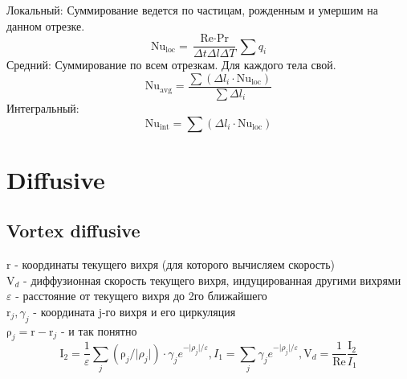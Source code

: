 \documentclass[14pt]{extreport}
\newcommand{\br}[1]{\boldsymbol{\mathrm{#1}}}
\newcommand{\Reyn}{\text{Re}}
\newcommand{\Pran}{\text{Pr}}
\newcommand{\Nuss}{\text{Nu}}
\begin{document}
Локальный: Суммирование ведется по частицам, рожденным и умершим на данном отрезке.
$$\Nuss_\text{loc} = \dfrac{\Reyn \cdot \Pran}{\Delta t \Delta l \Delta T} \sum q_i$$
Средний: Суммирование по всем отрезкам. Для каждого тела свой.
$$\Nuss_\text{avg} = \dfrac{\sum (\Delta l_i \cdot \Nuss_\text{loc})}{\sum \Delta l_i}$$
Интегральный:
$$\Nuss_\text{int} = \sum ( \Delta l_i \cdot \Nuss_\text{loc})$$


\newpage
\section{Diffusive}
\subsection{Vortex diffusive}

$\br r$ - координаты текущего вихря (для которого вычисляем скорость) \\
$\br V_d$ - диффузионная скорость текущего вихря, индуцированная другими вихрями \\
$\varepsilon$ - расстояние от текущего вихря до 2го ближайшего \\
$\br r_j, \gamma_j$ - координата j-го вихря и его циркуляция \\
$\br\rho_j = \br r - \br r_j$ - и так понятно \\

\begin{equation*}
\br I_2 = \dfrac{1}{\varepsilon}
\sum\limits_j (\br\rho_j / \lvert\rho_j\rvert)\cdot\gamma_j e^{-\lvert\rho_j\rvert/\varepsilon},
I_1 = {\sum\limits_j \gamma_j e^{-\lvert\rho_j\rvert/\varepsilon}},
\br V_d = \dfrac{1}{\Reyn} \dfrac{\br I_2}{I_1}
\end{equation*}

\begin{center}\setlength\fboxsep{0pt}
\setlength\fboxrule{0.5pt}
\end{center}
\end{document}
